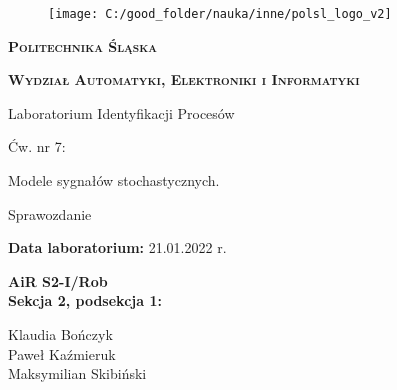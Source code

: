 \documentclass[11pt, a4paper]{article}
\begin{document}

\begin{titlepage}
{\LARGE
\begin{center}
	\begin{figure}[h!]
		\centering
		\texttt{[image: C:/good\_folder/nauka/inne/polsl\_logo\_v2]}
	\end{figure}
	
	\vspace{0.25cm}
	
	\textbf{\textsc{Politechnika Śląska}}
	
	\textbf{\textsc{Wydział Automatyki, Elektroniki i Informatyki}}
	
	\vspace{1.5cm}
	
	Laboratorium Identyfikacji Procesów
	
	\vspace{1.5cm}
	
	Ćw. nr 7:
	
	Modele sygnałów stochastycznych.
	
	\vspace{0.5cm}
	
	{\Large Sprawozdanie}
\end{center}
}

\vfill

{\Large
\noindent
\textbf{Data laboratorium:} 21.01.2022 r.

\vspace{0.5cm}

\noindent
\textbf{AiR S2-I/Rob}\\
\textbf{Sekcja 2, podsekcja 1:}

\noindent
\hspace*{0.5cm} Klaudia Bończyk\\
\hspace*{0.5cm} Paweł Kaźmieruk\\
\hspace*{0.5cm} Maksymilian Skibiński\\


\vspace{0.5cm}
}

\begin{center}
\end{center}
\end{titlepage}

\setcounter{page}{2}
\end{document}

